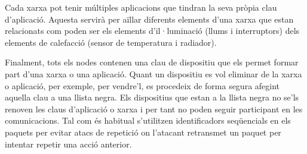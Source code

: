 Cada xarxa pot tenir múltiples aplicacions que tindran la seva pròpia clau d'aplicació.
Aquesta servirà per aïllar diferents elements d'una xarxa que estan relacionats com poden ser els elements d'il·luminació (llums i interruptors) dels elements de calefacció (sensor de temperatura i radiador).

Finalment, tots els nodes contenen una clau de dispositiu que els permet formar part d'una xarxa o una aplicació.
Quant un dispositiu es vol eliminar de la xarxa o aplicació, per exemple, per vendre'l, es procedeix de forma segura afegint aquella clau a una llista negra.
Els dispositius que estan a la llista negra no se'ls renoven les claus d'aplicació o xarxa i per tant no poden seguir participant en les comunicacions.
Tal com és habitual s'utilitzen identificadors seqüencials en els paquets per evitar atacs de repetició on l'atacant retransmet un paquet per intentar repetir una acció anterior.

